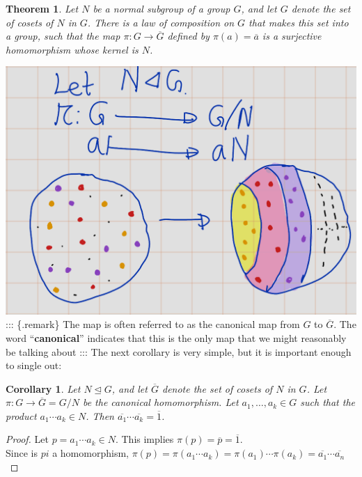 \documentclass[
]{book}
\newtheorem{theorem}{Theorem}[chapter]
\newtheorem{corollary}{Corollary}[chapter]
\theoremstyle{definition}
\theoremstyle{definition}
\theoremstyle{definition}
\theoremstyle{definition}
\theoremstyle{remark}
\begin{document}
\begin{theorem}
\protect\hypertarget{thm:2122}{}\label{thm:2122}Let \(N\) be a normal subgroup of a group \(G\), and let \(G\) denote the set of cosets of \(N\) in \(G\). There is a law of composition on \(G\) that makes this set into a group, such that the map \(\pi: G \to \overline{G}\) defined by \(\pi(a) = \overline{a}\) is a surjective homomorphism whose kernel is \(N\).
\end{theorem}

\includegraphics{figures/ch_2/fig29.png}
::: \{.remark\}
The map is often referred to as the canonical map from \(G\) to \(\overline{G}\). The word ``\textbf{canonical}''
indicates that this is the only map that we might reasonably be talking about
:::
The next corollary is very simple, but it is important enough to single out:

\begin{corollary}
\protect\hypertarget{cor:unnamed-chunk-39}{}\label{cor:unnamed-chunk-39}Let \(N \trianglelefteq G\), and let \(\overline{G}\) denote the set of cosets of \(N\) in \(G\). Let \(\pi: G \to \overline{G}=G/N\) be the canonical homomorphism. Let \(a_1, \ldots, a_k\in G\) such that the product \(a_1 \cdots a_k\in N\). Then \(\overline{a_1} \cdots \overline{a_k} = \overline{1}\).
\end{corollary}

\begin{proof}
Let \(p=a_1 \cdots a_k\in N\). This implies
\(\pi(p)=\overline{p}=\overline{1}\).\\
Since is \(pi\) a homomorphism, \(\pi(p)=\pi(a_1 \cdots a_k)=\pi(a_1)\cdots \pi(a_k)=\overline{a_1}\cdots\overline{a_n}\)
\end{proof}
\end{document}
